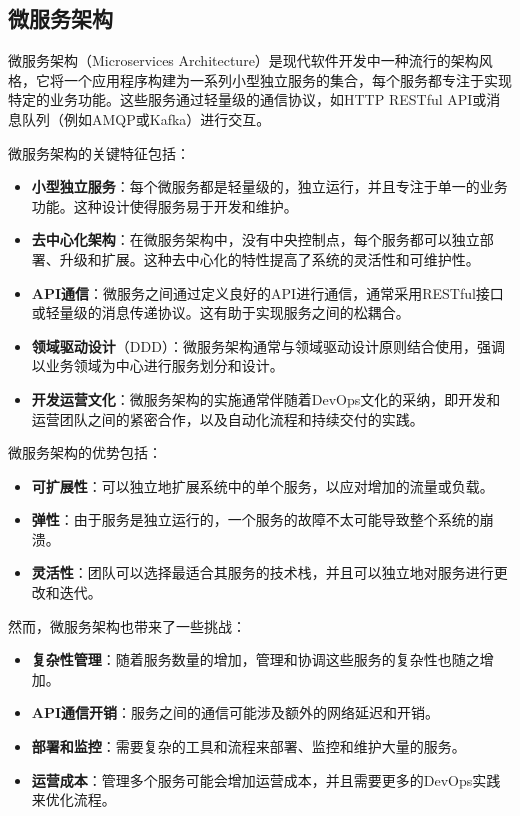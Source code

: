\subsection{微服务架构}
微服务架构（Microservices Architecture）是现代软件开发中一种流行的架构风格，它将一个应用程序构建为一系列小型独立服务的集合，每个服务都专注于实现特定的业务功能。这些服务通过轻量级的通信协议，如HTTP RESTful API或消息队列（例如AMQP或Kafka）进行交互。

微服务架构的关键特征包括：

\begin{itemize}
	\item \textbf{小型独立服务}：每个微服务都是轻量级的，独立运行，并且专注于单一的业务功能。这种设计使得服务易于开发和维护。
	
	\item \textbf{去中心化架构}：在微服务架构中，没有中央控制点，每个服务都可以独立部署、升级和扩展。这种去中心化的特性提高了系统的灵活性和可维护性。
	
	\item \textbf{API通信}：微服务之间通过定义良好的API进行通信，通常采用RESTful接口或轻量级的消息传递协议。这有助于实现服务之间的松耦合。
	
	\item \textbf{领域驱动设计}（DDD）：微服务架构通常与领域驱动设计原则结合使用，强调以业务领域为中心进行服务划分和设计。
	
	\item \textbf{开发运营文化}：微服务架构的实施通常伴随着DevOps文化的采纳，即开发和运营团队之间的紧密合作，以及自动化流程和持续交付的实践。
\end{itemize}

微服务架构的优势包括：

\begin{itemize}
	\item \textbf{可扩展性}：可以独立地扩展系统中的单个服务，以应对增加的流量或负载。
	
	\item \textbf{弹性}：由于服务是独立运行的，一个服务的故障不太可能导致整个系统的崩溃。
	
	\item \textbf{灵活性}：团队可以选择最适合其服务的技术栈，并且可以独立地对服务进行更改和迭代。
\end{itemize}

然而，微服务架构也带来了一些挑战：

\begin{itemize}
	\item \textbf{复杂性管理}：随着服务数量的增加，管理和协调这些服务的复杂性也随之增加。
	
	\item \textbf{API通信开销}：服务之间的通信可能涉及额外的网络延迟和开销。
	
	\item \textbf{部署和监控}：需要复杂的工具和流程来部署、监控和维护大量的服务。
	
	\item \textbf{运营成本}：管理多个服务可能会增加运营成本，并且需要更多的DevOps实践来优化流程。
\end{itemize}

